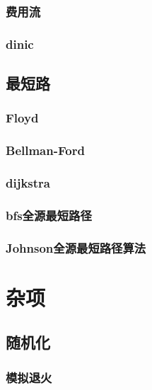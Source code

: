 \documentclass[10pt,a4paper]{article}
\begin{document}
\subsubsection{费用流}

\subsubsection{dinic}

\subsection{最短路}
\subsubsection{Floyd}
\begin{spacing}{1.5}

\end{spacing}

\subsubsection{Bellman-Ford}
\begin{spacing}{1.5}

\end{spacing}

\subsubsection{dijkstra}

\subsubsection{bfs全源最短路径}

\subsubsection{Johnson全源最短路径算法}

\section{杂项}
\subsection{随机化}
\subsubsection{模拟退火}

\end{document}
